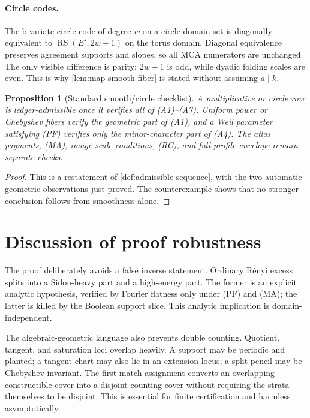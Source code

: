 \documentclass[12pt,a4paper]{amsart}
\numberwithin{equation}{section}
\newtheorem{proposition}[proposition]{Proposition}
\theoremstyle{remark}
\DeclareMathOperator{\RS}{RS}
\newcommand{\Renyi}{R\'enyi}
\begin{document}
\paragraph{Circle codes.}
The bivariate circle code of degree \(w\) on a circle-domain set is
diagonally equivalent to \(\RS(E',2w+1)\) on the torus domain.  Diagonal
equivalence preserves agreement supports and slopes, so all MCA numerators
are unchanged.  The only visible difference is parity: \(2w+1\) is odd,
while dyadic folding scales are even.  This is why
\cref{lem:map-smooth-fiber} is stated without assuming \(a\mid k\).

\begin{proposition}[Standard smooth/circle checklist]\label{prop:standard-admissible}
A multiplicative or circle row is ledger-admissible once it verifies all of
\textup{(A1)}--\textup{(A7)}.  Uniform power or Chebyshev fibers verify the
geometric part of \textup{(A1)}, and a Weil parameter satisfying
\textup{(PF)} verifies only the minor-character part of \textup{(A4)}.
The atlas payments, \textup{(MA)}, image-scale conditions,
\textup{(RC)}, and full profile envelope remain separate checks.
\end{proposition}

\begin{proof}
This is a restatement of \cref{def:admissible-sequence}, with the two
automatic geometric observations just proved.  The counterexample shows
that no stronger conclusion follows from smoothness alone.
\end{proof}

\section{Discussion of proof robustness}\label{sec:robustness}

The proof deliberately avoids a false inverse statement.  Ordinary
\Renyi{} excess splits into a Sidon-heavy part and a high-energy part.  The
former is an explicit analytic hypothesis, verified by Fourier flatness
only under \textup{(PF)} and \textup{(MA)}; the latter is killed by the
Boolean support slice.  This analytic implication is domain-independent.

The algebraic-geometric language also prevents double counting.  Quotient, tangent, and saturation loci overlap heavily.  A support may be periodic and planted; a tangent chart may also lie in an extension locus; a split pencil may be Chebyshev-invariant.  The first-match assignment converts an overlapping constructible cover into a disjoint counting cover without requiring the strata themselves to be disjoint.  This is essential for finite certification and harmless asymptotically.
\end{document}
